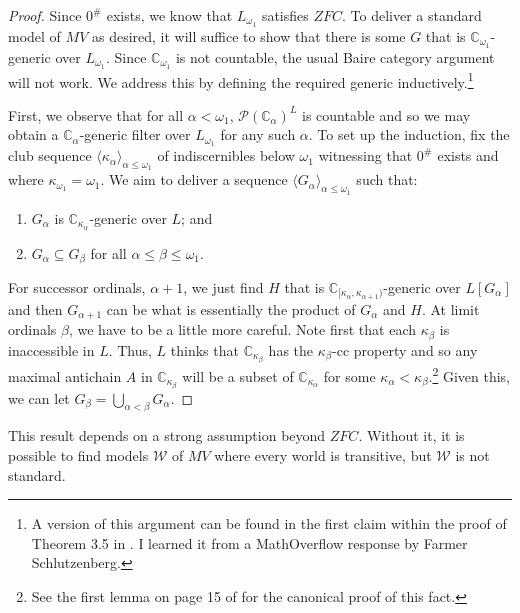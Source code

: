 \documentclass[10pt,a4paper]{amsart}
\numberwithin{equation}{section}
\numberwithin{figure}{section}
\theoremstyle{plain}
\theoremstyle{plain}
\theoremstyle{plain}
\theoremstyle{plain}
\theoremstyle{remark}
\theoremstyle{plain}
\theoremstyle{definition}
\begin{document}
\begin{proof}
Since $0^{\#}$ exists, we know that $L_{\omega_{1}}$ satisfies $ZFC$.
To deliver a standard model of $MV$ as desired, it will suffice to
show that there is some $G$ that is $\mathbb{C}_{\omega_{1}}$-generic
over $L_{\omega_{1}}$. Since $\mathbb{C}_{\omega_{1}}$ is not countable,
the usual Baire category argument will not work. We address this by
defining the required generic inductively.\footnote{A version of this argument can be found in the first claim within
the proof of Theorem 3.5 in \citep{HjorthU2}. I learned it from a
MathOverflow response by Farmer Schlutzenberg.}

First, we observe that for all $\alpha<\omega_{1}$, $\mathcal{P}(\mathbb{C}_{\alpha})^{L}$
is countable and so we may obtain a $\mathbb{C}_{\alpha}$-generic
filter over $L_{\omega_{1}}$ for any such $\alpha$. To set up the
induction, fix the club sequence $\langle\kappa_{\alpha}\rangle_{\alpha\leq\omega_{1}}$
of indiscernibles below $\omega_{1}$ witnessing that $0^{\#}$ exists
and where $\kappa_{\omega_{1}}=\omega_{1}$. We aim to deliver a sequence
$\langle G_{\alpha}\rangle_{\alpha\leq\omega_{1}}$ such that:
\begin{enumerate}
\item $G_{\alpha}$ is $\mathbb{C}_{\kappa_{\alpha}}$-generic over $L$;
and 
\item $G_{\alpha}\subseteq G_{\beta}$ for all $\alpha\leq\beta\leq\omega_{1}$. 
\end{enumerate}
For successor ordinals, $\alpha+1$, we just find $H$ that is $\mathbb{C}_{[\kappa_{\alpha},\kappa_{\alpha+1})}$-generic
over $L[G_{\alpha}]$ and then $G_{\alpha+1}$ can be what is essentially
the product of $G_{\alpha}$ and $H$. At limit ordinals $\beta$,
we have to be a little more careful. Note first that each $\kappa_{\beta}$
is inaccessible in $L$. Thus, $L$ thinks that $\mathbb{C}_{\kappa_{\beta}}$
has the $\kappa_{\beta}$-cc property and so any maximal antichain
$A$ in $\mathbb{C}_{\kappa_{\beta}}$ will be a subset of $\mathbb{C}_{\kappa_{\alpha}}$
for some $\kappa_{\alpha}<\kappa_{\beta}$.\footnote{See the first lemma on page 15 of \citep{Solovay1970AMO} for the
canonical proof of this fact.} Given this, we can let $G_{\beta}=\bigcup_{\alpha<\beta}G_{\alpha}$. 
\end{proof}
This result depends on a strong assumption beyond $ZFC$. Without
it, it is possible to find models $\mathcal{W}$ of $MV$ where every
world is transitive, but $\mathcal{W}$ is not standard.
\end{document}

